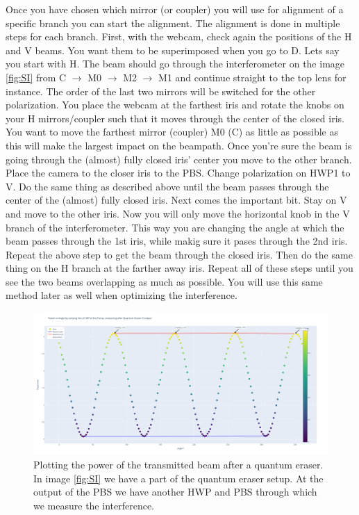 Once you have chosen which mirror (or coupler) you will use for alignment of a specific branch you can start the alignment.
The alignment is done in multiple steps for each branch. First, with the webcam, check again the positions of the H and V beams. You want them to be superimposed when you go to D. 
Lets say you start with H. The beam should go through the interferometer on the image \ref{fig:SI} from C $\rightarrow$ M0 $\rightarrow$ M2 $\rightarrow$ M1 and 
continue straight to the top lens for instance. The order of the last two mirrors will be switched for the other polarization. 
You place the webcam at the farthest iris and rotate the knobs on your H mirrors/coupler such that it moves through the center of the closed iris.
You want to move the farthest mirror (coupler) M0 (C) as little as possible as this will make the largest impact on the beampath.
Once you're sure the beam is going through the (almost) fully closed iris' center you move to the other branch.
Place the camera to the closer iris to the PBS. Change polarization on HWP1 to V. Do the same thing as described above until the beam passes through the center of the (almost) fully closed iris.
Next comes the important bit. Stay on V and move to the other iris. Now you will only move the horizontal knob in the V branch of the interferometer.
This way you are changing the angle at which the beam passes through the 1st iris, while makig sure it pases through the 2nd iris. 
Repeat the above step to get the beam through the closed iris. Then do the same thing on the H branch at the farther away iris.
Repeat all of these steps until you see the two beams overlapping as much as possible. You will use this same method later as well when
optimizing the interference.
\begin{figure}[H]
\begin{center}
	\includegraphics[width=12cm]{InterferencePlot.png}
\end{center}
\caption{Plotting the power of the transmitted beam after a quantum eraser. In image \ref{fig:SI} we have a part of the quantum eraser setup.
At the output of the PBS we have another HWP and PBS through which we measure the interference.}
\label{fig:InterferencePlot}
\end{figure}
